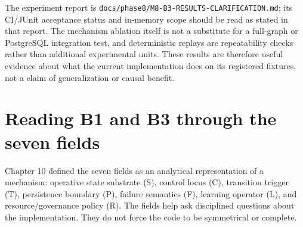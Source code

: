 The experiment report is \texttt{docs/phase8/M8-B3-RESULTS-CLARIFICATION.md}; its CI/JUnit acceptance status and in-memory scope should be read as stated in that report. The mechanism ablation itself is not a substitute for a full-graph or PostgreSQL integration test, and deterministic replays are repeatability checks rather than additional experimental units. These results are therefore useful evidence about what the current implementation does on its registered fixtures, not a claim of generalization or causal benefit.

\section{Reading B1 and B3 through the seven fields}
\label{sec:ch21-seven-fields}

Chapter 10 defined the seven fields as an analytical representation of a mechanism: operative state substrate (S), control locus (C), transition trigger (T), persistence boundary (P), failure semantics (F), learning operator (L), and resource/governance policy (R). The fields help ask disciplined questions about the implementation. They do not force the code to be symmetrical or complete.

